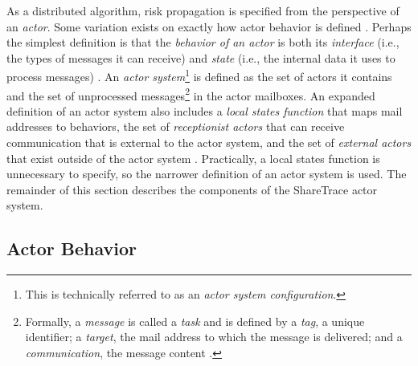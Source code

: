As a distributed algorithm, risk propagation is specified from the perspective of an \emph{actor}. Some variation exists on exactly how actor behavior is defined \citep{Agha1985, Koster2016}. Perhaps the simplest definition is that the \emph{behavior of an actor} is both its \emph{interface} (i.e., the types of messages it can receive) and \emph{state} (i.e., the internal data it uses to process messages) \citep{Koster2016}. An \emph{actor system}\footnote{This is technically referred to as an \emph{actor system configuration}.} is defined as the set of actors it contains and the set of unprocessed messages\footnote{Formally, a \emph{message} is called a \emph{task} and is defined by a \emph{tag}, a unique identifier; a \emph{target}, the mail address to which the message is delivered; and a \emph{communication}, the message content \citep{Agha1985}.} in the actor mailboxes. An expanded definition of an actor system also includes a \emph{local states function} that maps mail addresses to behaviors, the set of \emph{receptionist actors} that can receive communication that is external to the actor system, and the set of \emph{external actors} that exist outside of the actor system \citep{Agha1985}. Practically, a local states function is unnecessary to specify, so the narrower definition of an actor system is used. The remainder of this section describes the components of the ShareTrace actor system.

\subsection{Actor Behavior}\label{sec:actor-behavior}

